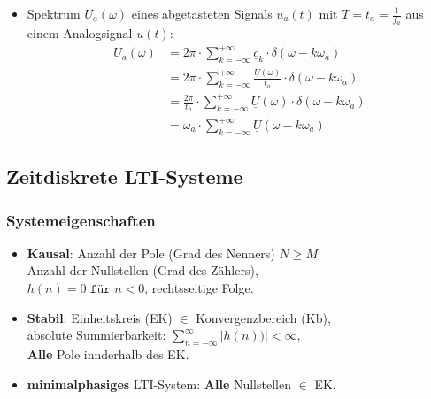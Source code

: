 \begin{itemize}
{	\textit{Abhilfe}: Eingangssignal auf $\omega_g$-Band begrenzen und\\ \textbf{Abtasttheorem} einhalten, Verringerung von $t_a$.}
\normalsize
\begin{gather*}
	\boxed{\omega_a \ge 2 \omega_g} \text{ bzw. } f_a \ge 2 f_g\\
	\boxed{\omega_g \le \frac{\omega_a}{2}} = \frac{1}{2} \cdot \frac{2\pi}{t_a} \text{ bzw. } f_g \ge \frac{f_a}{2}
\end{gather*}
{\footnotesize Merke: zeitbegrenztes Signal: $\infty$ langes Spektrum $\rightarrow$ Aliasing\\
Dirac-Sprung im Signal: $\infty$ hohe $f$ im Spektrum $\rightarrow$ Aliasing}

\item Spektrum $U_a(\omega)$ eines abgetasteten Signals $u_a(t)$ mit $T=t_a = \frac{1}{f_a}$ aus einem Analogsignal $u(t)$:
\begin{align*}
U_a(\omega) &= 2\pi \cdot \sum_{k=-\infty}^{+\infty} \underline{c}_k \cdot \delta(\omega-k\omega_a)\\
& = 2\pi \cdot \sum_{k=-\infty}^{+\infty} \frac{\underline{U}(\omega)}{t_a} \cdot \delta(\omega-k\omega_a)\\
&= \frac{2\pi}{t_a} \cdot \sum_{k=-\infty}^{+\infty} \underline{U}(\omega) \cdot \delta(\omega-k\omega_a) \\
& =  \omega_a \cdot \sum_{k=-\infty}^{+\infty} \underline{U}(\omega-k\omega_a)
\end{align*}

\end{itemize}
\clearpage
\vspace{-1.5em}
\subsection{Zeitdiskrete LTI-Systeme}
\subsubsection{Systemeigenschaften}
\begin{itemize}
	\item \textbf{Kausal}:
	      Anzahl der Pole (Grad des Nenners)  $N\ge M$\\
	      Anzahl der Nullstellen (Grad des Zählers),\\
	      $ h(n) = 0 \texttt{ für } n<0 $, rechtsseitige Folge.
	\item \textbf{Stabil}:
	      Einheitskreis (EK) $\in$ Konvergenzbereich (Kb),\\
	   absolute Summierbarkeit: $ \sum_{n=-\infty}^{\infty}|h(n))| < \infty $,\\
	   \textbf{Alle} Pole innderhalb des EK.
	\item \textbf{minimalphasiges} LTI-System: \textbf{Alle} Nullstellen $\in$ EK.
\end{itemize}


